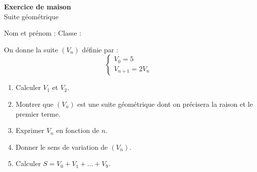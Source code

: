 


\begin{center}
{\LARGE\bfseries Exercice de maison}\\[4pt]
{\large Suite géométrique}
\end{center}

\vspace{4pt}
Nom et prénom : \dotfill \quad Classe : \dotfill

\vspace{6pt}
\begin{tcolorbox}[colback=white,colframe=black,boxrule=0.5pt,arc=1pt,title=\textbf{Énoncé},
  coltitle=black,colbacktitle=gray!15]
On donne la suite $(V_n)$ définie par :
\[
\begin{cases}
V_0 = 5\\
V_{n+1} = 2V_n
\end{cases}
\]
\begin{enumerate}[nosep]
  \item Calculer $V_1$ et $V_2$.
  \item Montrer que $(V_n)$ est une suite géométrique dont on précisera la raison et le premier terme.
  \item Exprimer $V_n$ en fonction de $n$.
  \item Donner le sens de variation de $(V_n)$.
  \item Calculer $S = V_0 + V_1 + \dots + V_9$.
\end{enumerate}
\end{tcolorbox}


